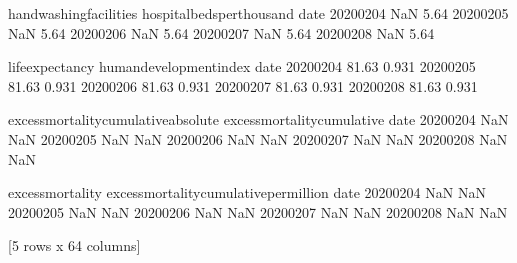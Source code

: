 \documentclass[letterpaper,10pt,english]{jupyterBook}
\begin{document}
\begin{sphinxVerbatim}[commandchars=\\\{\}]
            handwashing\PYGZus{}facilities  hospital\PYGZus{}beds\PYGZus{}per\PYGZus{}thousand  \PYGZbs{}
date                                                             
2020\PYGZhy{}02\PYGZhy{}04                     NaN                        5.64   
2020\PYGZhy{}02\PYGZhy{}05                     NaN                        5.64   
2020\PYGZhy{}02\PYGZhy{}06                     NaN                        5.64   
2020\PYGZhy{}02\PYGZhy{}07                     NaN                        5.64   
2020\PYGZhy{}02\PYGZhy{}08                     NaN                        5.64   

            life\PYGZus{}expectancy  human\PYGZus{}development\PYGZus{}index  \PYGZbs{}
date                                                   
2020\PYGZhy{}02\PYGZhy{}04            81.63                    0.931   
2020\PYGZhy{}02\PYGZhy{}05            81.63                    0.931   
2020\PYGZhy{}02\PYGZhy{}06            81.63                    0.931   
2020\PYGZhy{}02\PYGZhy{}07            81.63                    0.931   
2020\PYGZhy{}02\PYGZhy{}08            81.63                    0.931   

            excess\PYGZus{}mortality\PYGZus{}cumulative\PYGZus{}absolute  excess\PYGZus{}mortality\PYGZus{}cumulative  \PYGZbs{}
date                                                                            
2020\PYGZhy{}02\PYGZhy{}04                                   NaN                          NaN   
2020\PYGZhy{}02\PYGZhy{}05                                   NaN                          NaN   
2020\PYGZhy{}02\PYGZhy{}06                                   NaN                          NaN   
2020\PYGZhy{}02\PYGZhy{}07                                   NaN                          NaN   
2020\PYGZhy{}02\PYGZhy{}08                                   NaN                          NaN   

            excess\PYGZus{}mortality  excess\PYGZus{}mortality\PYGZus{}cumulative\PYGZus{}per\PYGZus{}million  
date                                                                   
2020\PYGZhy{}02\PYGZhy{}04               NaN                                      NaN  
2020\PYGZhy{}02\PYGZhy{}05               NaN                                      NaN  
2020\PYGZhy{}02\PYGZhy{}06               NaN                                      NaN  
2020\PYGZhy{}02\PYGZhy{}07               NaN                                      NaN  
2020\PYGZhy{}02\PYGZhy{}08               NaN                                      NaN  

[5 rows x 64 columns]
\end{sphinxVerbatim}
\end{document}
